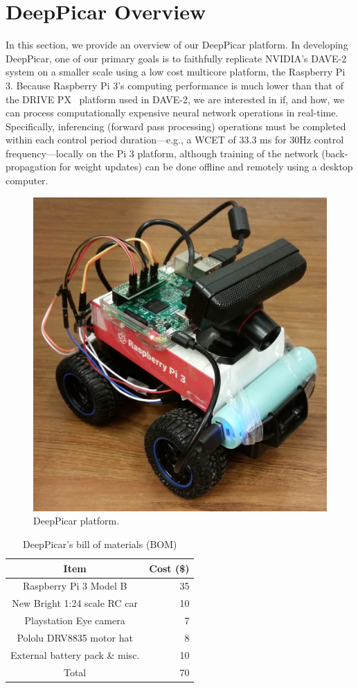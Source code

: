 
\section{DeepPicar Overview}\label{sec:overview}

In this section, we provide an overview of our DeepPicar platform.
In developing DeepPicar, one of our primary goals is to faithfully
replicate NVIDIA's DAVE-2 system on a smaller scale using a low cost
multicore platform, the Raspberry Pi 3. Because Raspberry Pi 3's
computing performance is much lower than that of the DRIVE
PX~\cite{drivepx} platform used in DAVE-2, we are interested in if,
and how, we can process 
computationally expensive neural network operations in
real-time. Specifically, inferencing (forward pass processing)
operations must be completed within each control period
duration---e.g., a WCET of 33.3 ms for 30Hz control 
frequency---locally on the Pi 3 platform, although training of the 
network (back-propagation for weight updates) can be done offline and 
remotely using a desktop computer.

\begin{figure}[h]
  \centering
  \includegraphics[width=.38\textwidth]{figs/DeepPicar_platform}
  \caption{DeepPicar platform.}
  \label{fig:overview}
\end{figure}

\begin{table}[h]
  \centering
  \begin{tabular}{|c|r|}
    \hline
    Item                    & Cost (\$) \\
    \hline
    Raspberry Pi 3 Model B  & 35 \\
    New Bright 1:24 scale RC car       & 10 \\
    Playstation Eye camera  &  7 \\
    Pololu DRV8835 motor hat&  8 \\
    External battery pack \& misc.   & 10 \\
    \hline
    Total                   & 70 \\
    \hline
  \end{tabular}
  \caption{DeepPicar's bill of materials (BOM)}
  \label{tbl:carbom}
\end{table}

